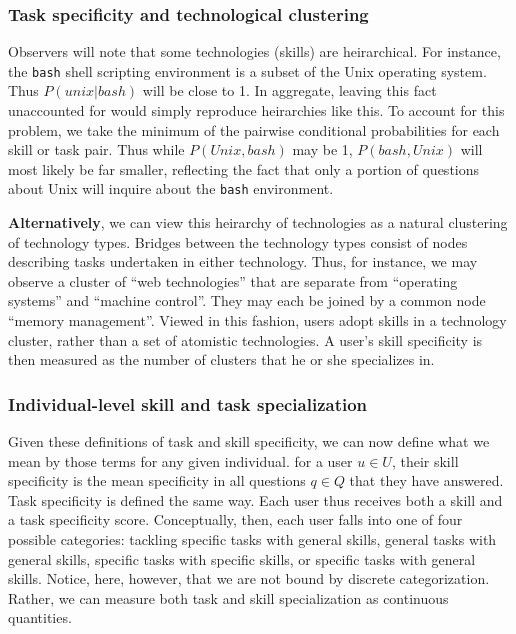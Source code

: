\documentclass[11pt]{article}
\begin{document}
\subsubsection{Task specificity and technological clustering}
\label{sec:task-spec-techn}

Observers will note that some technologies (skills) are
heirarchical. For instance, the \texttt{bash} shell scripting
environment is a subset of the Unix operating system. Thus $P(unix |
bash)$ will be close to 1. In aggregate, leaving this fact unaccounted
for would simply reproduce heirarchies like this. To account for this
problem, we take the minimum of the pairwise conditional probabilities
for each skill or task pair. Thus while $P(Unix, bash)$ may be 1,
$P(bash, Unix)$ will most likely be far smaller, reflecting the fact
that only a portion of questions about Unix will inquire about the
\texttt{bash} environment.

\textbf{Alternatively}, we can view this heirarchy of technologies as
a natural clustering of technology types. Bridges between the
technology types consist of nodes describing tasks undertaken in
either technology. Thus, for instance, we may
observe a cluster of ``web technologies'' that are separate from
``operating systems'' and ``machine control''. They may each be joined
by a common node ``memory management''. Viewed in this fashion,
users adopt skills in a technology cluster, rather than a set of atomistic
technologies. A user's skill specificity is then measured as the number of
clusters that he or she specializes in. 

\subsubsection{Individual-level skill and task specialization}
\label{sec:indiv-level-skill}

Given these definitions of task and skill specificity, we can now
define what we mean by those terms for any given individual. for a
user $u \in U$, their skill specificity is the mean specificity in all
questions $q \in Q$ that they have answered. Task specificity is
defined the same way. Each user thus receives both a skill and a task
specificity score. Conceptually, then, each user falls into one of
four possible categories: tackling specific tasks with general skills,
general tasks with general skills, specific tasks with specific
skills, or specific tasks with general skills. Notice, here, however,
that we are not bound by discrete categorization. Rather, we can
measure both task and skill specialization as continuous quantities.
\end{document}
